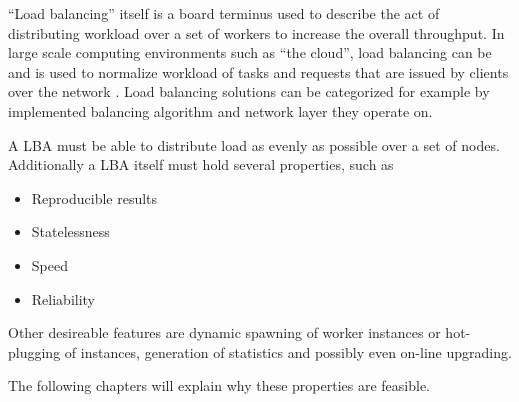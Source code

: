 ``Load balancing'' itself is a board terminus used to describe the act of
distributing workload over a set of workers to increase the overall throughput.
In large scale computing environments such as ``the cloud'', load balancing can
be and is used to normalize workload of tasks and requests that are issued by
clients over the network
\cite{alakeel2010guide}.
Load balancing solutions can be categorized for example by implemented balancing
algorithm and network layer they operate on.

A \ac{LBA} must be able to distribute load as evenly as possible
over a set of nodes.
Additionally a \ac{LBA} itself must hold several properties,
such as
\begin{itemize}
    \item Reproducible results
    \item Statelessness
    \item Speed
    \item Reliability
\end{itemize}
Other desireable features are dynamic spawning of worker instances or
hot-plugging of instances, generation of statistics and possibly even on-line
upgrading.

The following chapters will explain why these properties are feasible.

